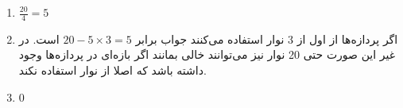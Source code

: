 \begin{enumerate}
    \item $\frac{20}{4} = 5$
    \item اگر پردازه‌ها از اول از 3 نوار استفاده می‌کنند جواب برابر
    $20 - 5 \times 3 = 5$
    است. در غیر این صورت حتی 20 نوار نیز می‌توانند خالی بمانند اگر بازه‌‌ای در پردازه‌ها وجود داشته باشد
    که اصلا از نوار استفاده نکند.
    \item $0$
\end{enumerate}




